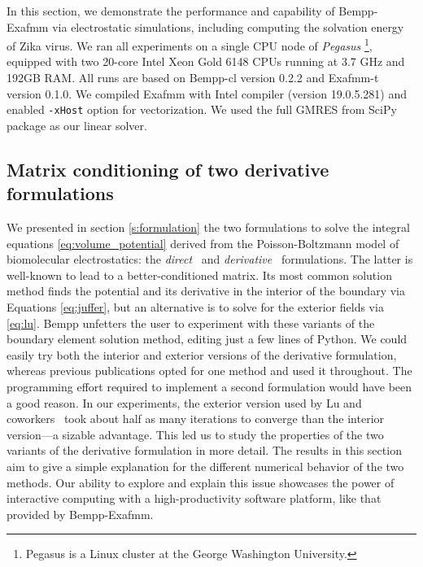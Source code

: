 In this section, we demonstrate the performance and capability of Bempp-Exafmm via electrostatic simulations, including computing the solvation energy of Zika virus.
We ran all experiments on a single CPU node of \textit{Pegasus} \footnote{Pegasus is a Linux cluster at the George Washington University.}, equipped with two 20-core Intel Xeon Gold 6148 CPUs running at 3.7 GHz and 192GB RAM.
All runs are based on Bempp-cl version 0.2.2 and Exafmm-t version 0.1.0.
We compiled Exafmm with Intel compiler (version 19.0.5.281) and enabled \texttt{-xHost} option for vectorization.
We used the full GMRES from SciPy package as our linear solver.

\subsection{Matrix conditioning of two derivative formulations} \label{result_conditioning}

We presented in section \ref{s:formulation} the two formulations to solve the integral equations  \eqref{eq:volume_potential} derived from the Poisson-Boltzmann model of biomolecular electrostatics: 
the \emph{direct}~\cite{YoonLenhoff1990}  and \emph{derivative}~\cite{JufferETal1991} formulations.
The latter is well-known to lead to a better-conditioned matrix.
Its most common solution method finds the potential and its derivative in the interior of the boundary via Equations \eqref{eq:juffer}, but an alternative is to solve for the exterior fields via \eqref{eq:lu}.
Bempp unfetters the user to experiment with these variants of the boundary element solution method, editing just a few lines of Python.
We could easily try both the interior and exterior versions of the derivative formulation, whereas previous publications opted for one method and used it throughout.
The programming effort required to implement a second formulation would have been a good reason.
In our experiments, the exterior version used by Lu and coworkers~\cite{LuETal2006,LuETal2009,ZhangETal2019} took about half as many iterations to converge than the interior version---a sizable advantage.
This led us to study the properties of the two variants of the derivative formulation in more detail.
The results in this section aim to give a simple explanation for the different numerical behavior of the two methods.
Our ability to explore and explain this issue showcases the power of interactive computing with a high-productivity software platform, like that provided by Bempp-Exafmm.

